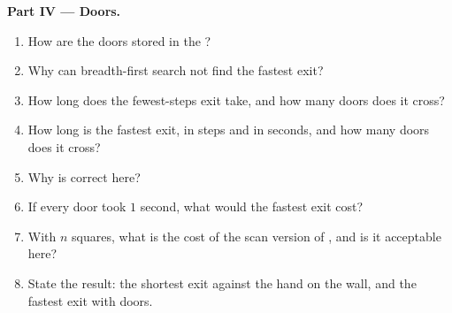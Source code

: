 \begin{problem}
\medskip\noindent\textbf{Part IV --- Doors.}
\begin{enumerate}[resume]
  \item How are the doors stored in the  ?
  \item Why can breadth-first search not find the fastest exit?
  \item How long does the fewest-steps exit take, and how many doors does it cross?
  \item How long is the fastest exit, in steps and in seconds, and how many doors does it cross?
  \item Why is  correct here?
  \item If every door took $1$ second, what would the fastest exit cost?
  \item With $n$ squares, what is the cost of the scan version of , and is it acceptable here?
  \item State the result: the shortest exit against the hand on the wall, and the fastest exit with doors.
\end{enumerate}
\end{problem}
